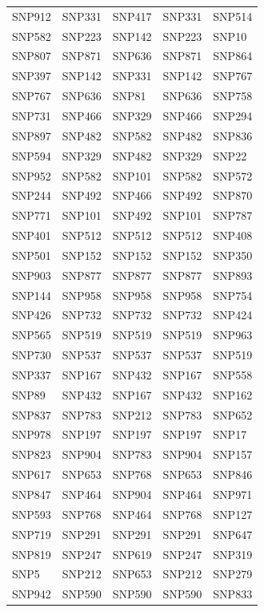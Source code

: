\begin{table}[ht]
\begin{tabular}{lllll}
  SNP912 & SNP331 & SNP417 & SNP331 & SNP514 \\ 
  SNP582 & SNP223 & SNP142 & SNP223 & SNP10 \\ 
  SNP807 & SNP871 & SNP636 & SNP871 & SNP864 \\ 
  SNP397 & SNP142 & SNP331 & SNP142 & SNP767 \\ 
  SNP767 & SNP636 & SNP81 & SNP636 & SNP758 \\ 
  SNP731 & SNP466 & SNP329 & SNP466 & SNP294 \\ 
  SNP897 & SNP482 & SNP582 & SNP482 & SNP836 \\ 
  SNP594 & SNP329 & SNP482 & SNP329 & SNP22 \\ 
  SNP952 & SNP582 & SNP101 & SNP582 & SNP572 \\ 
  SNP244 & SNP492 & SNP466 & SNP492 & SNP870 \\ 
  SNP771 & SNP101 & SNP492 & SNP101 & SNP787 \\ 
  SNP401 & SNP512 & SNP512 & SNP512 & SNP408 \\ 
  SNP501 & SNP152 & SNP152 & SNP152 & SNP350 \\ 
  SNP903 & SNP877 & SNP877 & SNP877 & SNP893 \\ 
  SNP144 & SNP958 & SNP958 & SNP958 & SNP754 \\ 
  SNP426 & SNP732 & SNP732 & SNP732 & SNP424 \\ 
  SNP565 & SNP519 & SNP519 & SNP519 & SNP963 \\ 
  SNP730 & SNP537 & SNP537 & SNP537 & SNP519 \\ 
  SNP337 & SNP167 & SNP432 & SNP167 & SNP558 \\ 
  SNP89 & SNP432 & SNP167 & SNP432 & SNP162 \\ 
  SNP837 & SNP783 & SNP212 & SNP783 & SNP652 \\ 
  SNP978 & SNP197 & SNP197 & SNP197 & SNP17 \\ 
  SNP823 & SNP904 & SNP783 & SNP904 & SNP157 \\ 
  SNP617 & SNP653 & SNP768 & SNP653 & SNP846 \\ 
  SNP847 & SNP464 & SNP904 & SNP464 & SNP971 \\ 
  SNP593 & SNP768 & SNP464 & SNP768 & SNP127 \\ 
  SNP719 & SNP291 & SNP291 & SNP291 & SNP647 \\ 
  SNP819 & SNP247 & SNP619 & SNP247 & SNP319 \\ 
  SNP5 & SNP212 & SNP653 & SNP212 & SNP279 \\ 
  SNP942 & SNP590 & SNP590 & SNP590 & SNP833 \\ 

\end{tabular}
\end{table}
